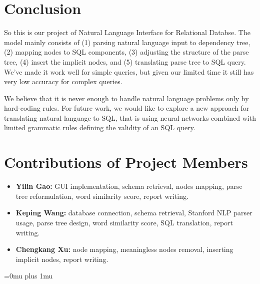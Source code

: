 \documentclass[twocolumn]{article}
\begin{document}
\section{Conclusion}
So this is our project of Natural Language Interface for Relational Databse. The model mainly consists of (1) parsing natural language input to dependency tree, (2) mapping nodes to SQL components, (3) adjusting the structure of the parse tree, (4) insert the implicit nodes, and (5) translating parse tree to SQL query. We've made it work well for simple queries, but given our limited time it still has very low accuracy for complex queries. 

We believe that it is never enough to handle natural language problems only by hard-coding rules. For future work, we would like to explore a new approach for translating natural language to SQL, that is using neural networks combined with limited grammatic rules defining the validity of an SQL query. 


\section{Contributions of Project Members}

\begin{itemize}
\item {\bf Yilin Gao:} GUI implementation, schema retrieval, nodes mapping, parse tree reformulation, word similarity score, report writing.
\item {\bf Keping Wang:} database connection, schema retrieval, Stanford NLP parser usage, parse tree design, word similarity score, SQL translation, report writing.
\item {\bf Chengkang Xu:} node mapping, meaningless nodes removal, inserting implicit nodes, report writing.
\end{itemize}


\Urlmuskip=0mu plus 1mu\relax


\end{document}
